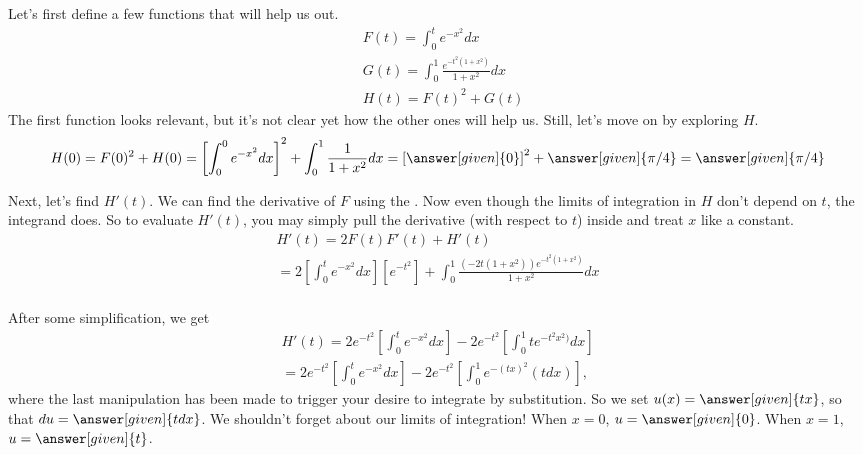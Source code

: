 \documentclass{ximera}
\begin{document}
\begin{exercise}
	Let's first define a few functions that will help us out.
	\begin{align*}
		&F(t)=\int_{0}^{t} e^{-x^2}dx \\
		&G(t)=\int_{0}^{1} \frac{e^{-t^2(1+x^2)}}{1+x^2} dx \\
		&H(t)=F(t)^2+G(t)
	\end{align*}
	The first function looks relevant, but it's not clear yet how the other ones will help us. Still, let's move on by exploring $H$.
	\begin{align*}
	H(0)= F(0)^2+H(0)=\left[\int_{0}^{0} e^{-x^2}dx \right]^2+\int_{0}^{1} \frac{1}{1+x^2} dx =  \left[ \answer[given]{0} \right]^2 + \answer[given]{\pi/4} = \answer[given]{\pi/4}
	\end{align*}
	
	Next, let's find $H'(t)$. We can find the derivative of $F$ using the . Now even though the limits of integration in $H$ don't depend on $t$, the integrand does. So to evaluate $H'(t)$, you may simply pull the derivative (with respect to $t$) inside and treat $x$ like a constant.
	\begin{align*}
	H'(t) =2F(t)F'(t)+H'(t) \\
	=2 \left[ \int_{0}^{t} e^{-x^2}dx \right] \left[ e^{-t^2} \right]+\int_{0}^{1} \frac{ (-2t(1+x^2)) e^{-t^2(1+x^2)}}{1+x^2} dx \\
	\end{align*}
	
	\begin{exercise}
		After some simplification, we get
		\begin{align*}
			H'(t)= 2e^{-t^2} \left[ \int_{0}^{t} e^{-x^2}dx \right] -2e^{-t^2} \left[ \int_{0}^{1} t e^{-t^2 x^2)} dx \right] \\
			=2e^{-t^2} \left[ \int_{0}^{t} e^{-x^2}dx \right] -2e^{-t^2} \left[ \int_{0}^{1} e^{-(tx)^2} (tdx) \right],
		\end{align*}
		where the last manipulation has been made to trigger your desire to integrate by substitution. So we set $u(x)=\answer[given]{tx}$, so that $du=\answer[given]{tdx}$. We shouldn't forget about our limits of integration! When $x=0$, $u=\answer[given]{0}$. When $x=1$, $u=\answer[given]{t}$.
		
	
	\end{exercise}


\end{exercise}
\end{document}
